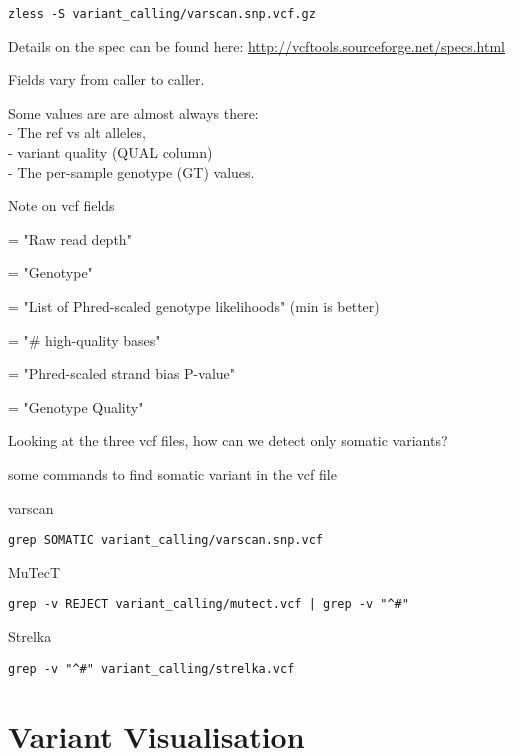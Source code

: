\begin{lstlisting}
zless -S variant_calling/varscan.snp.vcf.gz
\end{lstlisting}

Details on the spec can be found here:
\url{http://vcftools.sourceforge.net/specs.html}

Fields vary from caller to caller.
 
Some values are are almost always there: \\
   - The ref vs alt alleles, \\
   - variant quality (QUAL column) \\
   - The per-sample genotype (GT) values.

Note on vcf fields
\begin{description}[style=multiline,labelindent=0cm,align=right,leftmargin=\descriptionlabelspace,rightmargin=1.5cm,font=\ttfamily]
	\item[DP] = "Raw read depth"
	\item[GT] = "Genotype" 
	\item[PL] = "List of Phred-scaled genotype likelihoods" (min is better) 
	\item[DP] = "\# high-quality bases" 
	\item[SP] = "Phred-scaled strand bias P-value"  
	\item[GQ] = "Genotype Quality"
\end{description}

\begin{questions}
Looking at the three vcf files, how can we detect only somatic variants?
\end{questions}
\begin{answer}
some commands to find somatic variant in the vcf file

varscan
\begin{lstlisting}
grep SOMATIC variant_calling/varscan.snp.vcf 
\end{lstlisting}

MuTecT
\begin{lstlisting}
grep -v REJECT variant_calling/mutect.vcf | grep -v "^#"
\end{lstlisting}

Strelka
\begin{lstlisting}
grep -v "^#" variant_calling/strelka.vcf
\end{lstlisting}
\end{answer}


\newpage

\section{Variant Visualisation}

